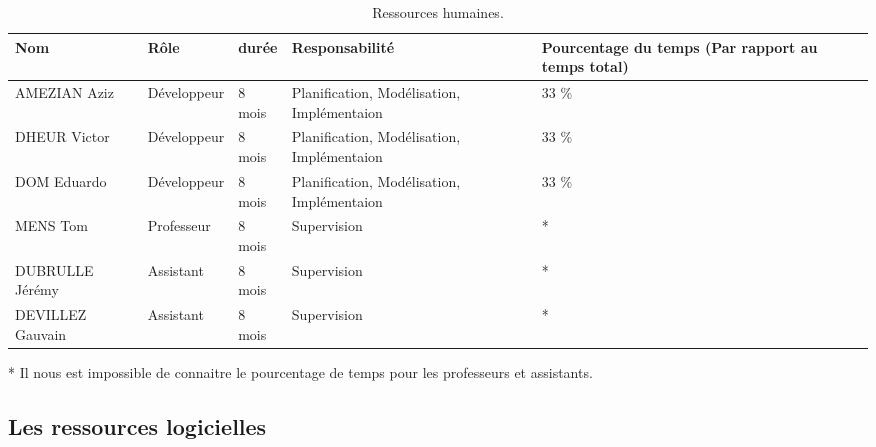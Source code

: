 \documentclass[]{article}
\begin{document}
\begin{table}[!htbp]
\begin{center}
\begin{tabular}{ | p{2.5cm}|p{2.5cm}|p{2cm}|p{4cm}|p{4cm} |}
\hline
Nom & R\^ole & durée & Responsabilité & Pourcentage du temps (Par rapport au temps total) \\
\hline
AMEZIAN Aziz & Développeur & 8 mois & Planification, Modélisation, Implémentaion & 33 \% \\
\hline
DHEUR Victor & Développeur & 8 mois & Planification, Modélisation, Implémentaion & 33 \% \\
\hline
DOM Eduardo & Développeur & 8 mois & Planification, Modélisation, Implémentaion & 33 \% \\
\hline
MENS Tom & Professeur & 8 mois & Supervision & * \\
\hline
DUBRULLE Jérémy & Assistant & 8 mois & Supervision & * \\
\hline
DEVILLEZ Gauvain & Assistant & 8 mois & Supervision & * \\
\hline
\end{tabular}
\end{center}
   \caption{Ressources humaines.}
   \label{tab:RH}
\end{table}

* Il nous est impossible de connaitre le pourcentage de temps pour les professeurs et assistants.

\subsection{Les ressources logicielles}





\end{document}
